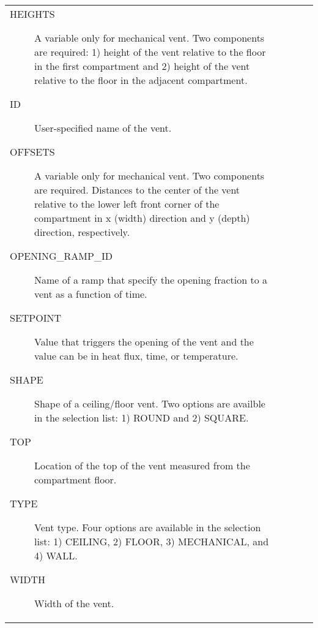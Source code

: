 \begin{longtable}{@{\extracolsep{\fill}}|l|l|l|l|l|}
\begin{adjustwidth}{1cm}{0cm}
\begin{description}
  \item[HEIGHTS] A variable only for mechanical vent. Two components are required: 1) height of the vent relative to the floor in the first compartment and 2) height of the vent relative to the floor in the adjacent compartment.
  \item[ID] User-specified name of the vent.
  \item[OFFSETS] A variable only for mechanical vent. Two components are required. Distances to the center of the vent relative to the lower left front corner of the compartment in x (width) direction and y (depth) direction, respectively.
  \item[OPENING\_RAMP\_ID] Name of a ramp that specify the opening fraction to a vent as a function of time.
  \item[SETPOINT] Value that triggers the opening of the vent and the value can be in heat flux, time, or temperature.
  \item[SHAPE] Shape of a ceiling/floor vent. Two options are availble in the selection list: 1) ROUND and 2) SQUARE.
  \item[TOP] Location of the top of the vent measured from the compartment floor.
  \item[TYPE] Vent type. Four options are available in the selection list: 1) CEILING, 2) FLOOR, 3) MECHANICAL, and 4) WALL.
  \item[WIDTH] Width of the vent.
\end{description}
\end{adjustwidth}

\vspace{\baselineskip}


\end{longtable}

